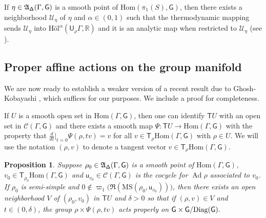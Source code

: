 \documentclass{amsart}
\theoremstyle{plain}
\newtheorem{proposition}{Proposition}[section]
\theoremstyle{definition}
\theoremstyle{remark}
\newcommand{\R}{\mathbb R}
\newcommand{\Ad}{\operatorname{Ad}}
\renewcommand{\sf}[1]{{\mathsf{#1}}}
\newcommand{\cal}{\mathcal}
\newcommand{\<}{\left <}
\renewcommand{\>}{\right >}
\newcommand{\G}{\Gamma}
\newcommand{\M}{\mathrm{MS}}
\newcommand{\co}{\sf u}
\begin{document}
If $\eta\in\frak A_{\sf\Delta}(\G,\sf G)$ is a smooth point of $\mathrm{Hom}(\pi_1(S),\sf G)$, then there exists a neighborhood $\cal U_\eta$ of $\eta$ 
and $\alpha\in(0,1)$  such that the thermodynamic mapping sends $\cal U_\eta$ into $\textrm{H\"ol}^\alpha(\sf U_\rho\G,\R)$ 
and it is an analytic map when restricted to $\cal U_\eta$ (see \cite[Proposition 6.2]{pressure}).


\subsection{Proper affine actions on the group manifold}


We are now ready to establish a 
weaker version of a recent result due to Ghosh-Kobayashi \cite{GK},  which suffices for our purposes. We include a proof for completeness.

If $U$ is a smooth open set in $\mathrm{Hom}(\Gamma,\sf G)$, then one can identify $\sf TU$ with an
open set in $\mathcal C(\Gamma,\sf G)$ and there exists a smooth map $\Psi:\sf TU\to \mathrm{Hom}(\Gamma,\sf G)$
with the property that $\frac{d}{dt}\Big|_{t=0}\Psi(\rho,tv)=v$ for all $v\in \sf T_\rho\mathrm{Hom}(\Gamma,\sf G)$ with $\rho\in U$.
We will use the notation $(\rho,v)$ to denote a tangent vector 	$v\in \sf T_\rho\mathrm{Hom}(\Gamma,\sf G)$.

\begin{proposition}\label{GxG} 
Suppose $\rho_0\in\frak A_{\sf \Delta}(\G,\sf G)$  is a smooth point of $\mathrm{Hom}(\Gamma,\sf G)$,  $v_0\in \sf T_{\rho_0}\mathrm{Hom}(\Gamma,\sf G)$
and $\co_{v_0}\in\mathcal C(\Gamma,\sf G)$ is the cocycle for $\Ad\rho$ associated to $v_0$.
If $\rho_0$ is semi-simple and  $0\notin\varpi_1\big(\Re(\M(\rho_0,\co_{v_0}))\big)$, then there exists an open neighborhood $V$ of $(\rho_0,v_0)$ in $\sf TU$ and $\delta>0$ 
so that if $(\rho, v)\in V$ and $t\in (0,\delta)$, 
the group $\rho\times \Psi(\rho,tv)$ acts properly on $\sf G\times\sf G/\rm{Diag}(\sf G).$ 
\end{proposition}
\end{document}
